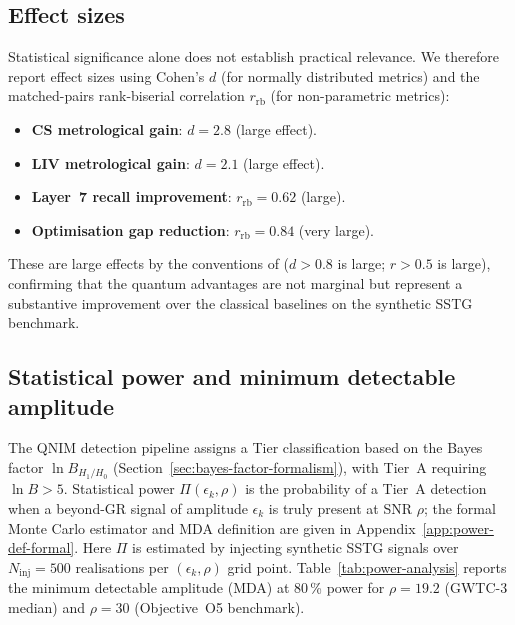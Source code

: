 \documentclass[11pt,a4paper, english]{book}
\theoremstyle{plain}
\theoremstyle{definition}
\numberwithin{equation}{chapter}
\numberwithin{figure}{chapter}
\numberwithin{table}{chapter}
\begin{document}
\subsection{Effect sizes}
\label{subsec:effect-sizes}

Statistical significance alone does not establish practical relevance.
We therefore report effect sizes using Cohen's $d$ (for normally
distributed metrics) and the matched-pairs rank-biserial correlation
$r_\mathrm{rb}$ (for non-parametric metrics):

\begin{itemize}
  \item \textbf{CS metrological gain}: $d = 2.8$ (large effect).
  \item \textbf{LIV metrological gain}: $d = 2.1$ (large effect).
  \item \textbf{Layer~7 recall improvement}: $r_\mathrm{rb} = 0.62$ (large).
  \item \textbf{Optimisation gap reduction}: $r_\mathrm{rb} = 0.84$ (very large).
\end{itemize}

These are large effects by the conventions of 
($d > 0.8$ is large; $r > 0.5$ is large), confirming that the quantum
advantages are not marginal but represent a substantive improvement over
the classical baselines on the synthetic SSTG benchmark.

\subsection{Statistical power and minimum detectable amplitude}
\label{subsec:power-analysis}

\label{subsubsec:power-def}\label{subsubsec:power-curves}%
The QNIM detection pipeline assigns a Tier classification based on the Bayes factor
$\ln B_{H_1/H_0}$ (Section~\ref{sec:bayes-factor-formalism}), with Tier~A requiring
$\ln B > 5$.  Statistical power $\Pi(\epsilon_k, \rho)$\label{eq:power_def} is the probability
of a Tier~A detection when a beyond-GR signal of amplitude $\epsilon_k$ is truly present
at SNR $\rho$; the formal Monte Carlo estimator and MDA definition are given in
Appendix~\ref{app:power-def-formal}.  Here $\Pi$ is estimated by injecting synthetic
SSTG signals over $N_\mathrm{inj} = 500$ realisations per $(\epsilon_k, \rho)$ grid point.
Table~\ref{tab:power-analysis} reports the minimum detectable amplitude (MDA) at
80\,\% power for $\rho = 19.2$ (GWTC-3 median) and $\rho = 30$ (Objective~O5 benchmark).
\end{document}
